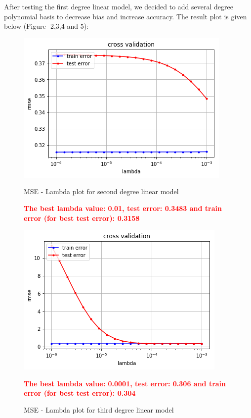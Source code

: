 \documentclass[10pt,conference,compsocconf]{IEEEtran}
\begin{document}
\vspace{-15pt}
After testing the first degree linear model, we decided to add several degree polynomial basis to decrease bias and increase accuracy. The result plot is given below (Figure -2,3,4 and 5):
\begin{center}
\begin{figure}
\includegraphics[scale=0.4]{linear_2}
\centering
\caption{MSE - Lambda plot for second degree linear model}
\textbf{\textcolor{red}{The best lambda value: 0.01, test error: 0.3483 and train error (for best test error): 0.3158}}
\vspace{5ex}

\includegraphics[scale=0.4]{linear_3}
\centering
\caption{MSE - Lambda plot for third degree linear model}
\textbf{\textcolor{red}{The best lambda value: 0.0001, test error: 0.306 and train error (for best test error): 0.304}}
\vspace{5ex}


\end{figure}
\end{center}
\end{document}

